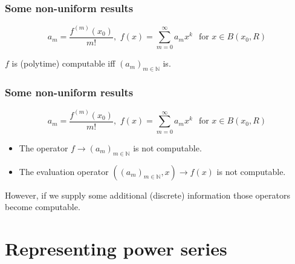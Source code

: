 \documentclass[xcolor=pdftex,dvipsnames,table]{beamer}
\newcommand{\N}{\ensuremath{\mathbb{N}}}
\begin{document}
\begin{frame}
\frametitle{Some non-uniform results}

$$a_m =\frac{f^{(m)}(x_0)}{m!} 
, \,\, f(x) = \sum_{m=0}^\infty a_mx^k \,\ \text{ for } x \in B(x_0,R)
$$
\vfill
\begin{theorem}
$f$ is (polytime) computable iff $(a_m)_{m \in \N}$ is.
\end{theorem}
\end{frame}
\begin{frame}
\frametitle{Some non-uniform results}
$$a_m =\frac{f^{(m)}(x_0)}{m!} 
, \,\, f(x) = \sum_{m=0}^\infty a_mx^k \,\ \text{ for } x \in B(x_0,R)
$$
\vfill
\begin{theorem}[M\"uller (1995)]
\begin{itemize}
\item The operator $f \to (a_m)_{m \in \N}$ is not computable.
\item The evaluation operator $((a_m)_{m \in \N},x) \to f(x) $ is not computable.
\end{itemize}
\end{theorem}
\pause
However, if we supply some additional (discrete) information those operators become computable.
\end{frame}
\section{Representing power series}
\end{document}
